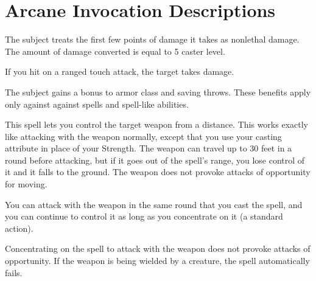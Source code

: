 \section{Arcane Invocation Descriptions}

\spellrng{\rngclose}
\begin{spelleffect}
The subject treats the first few points of damage it takes as nonlethal damage. The amount of damage converted is equal to 5 \add caster level.
\end{spelleffect}

\spellrng{\rngclose}
\begin{spelleffect}
If you hit on a ranged touch attack, the target takes damage.
\end{spelleffect}

\spellrng{\rngclose}
\begin{spelleffect}
  The subject gains a  bonus to armor class and saving throws. \bonusscalingdescription These benefits apply only against against spells and spell-like abilities.
\end{spelleffect}

\spellrng{\rngclose}
\begin{spelleffect}
This spell lets you control the target weapon from a distance. This works exactly like attacking with the weapon normally, except that you use your casting attribute in place of your Strength.
The weapon can travel up to 30 feet in a round before attacking, but if it goes out of the spell's range, you lose control of it and it falls to the ground. The weapon does not provoke attacks of opportunity for moving.
\par You can attack with the weapon in the same round that you cast the spell, and you can continue to control it as long as you concentrate on it (a standard action).
\end{spelleffect}
\begin{spellnotes}
Concentrating on the spell to attack with the weapon does not provoke attacks of opportunity. If the weapon is being wielded by a creature, the spell automatically fails.
\end{spellnotes}

